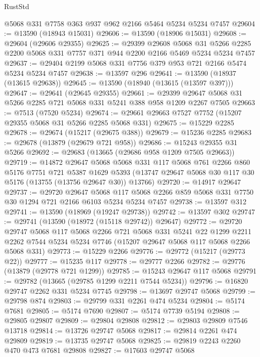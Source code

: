 \begin{lexlean}{RustStd}
\begin{coremodule}
    @5068
    @331
    @7758
    @363
    @937
    @962
    @2166
    @5464
    @5234
    @5234
    @7457
@29604 := @13590 (@18943 @15031)
@29606 := @13590 (@18906 @15031)
@29608 := @29604 (@29606 @29355)
@29625 := @29399
    @29608
    @5068
    @31
    @5266
    @2285
    @2200
    @5068
    @331
    @7757
    @371
    @944
    @2200
    @2166
    @5469
    @5234
    @5234
    @7457
@29637 := @29404 @2199 @5068 @331 @7756 @379 @953 @721 @2166 @5474 @5234 @5234 @7457
@29638 := @13597 @296
@29641 := @13590 (@18937 (@13615 @29638))
@29645 := @13590 (@18940 (@13615 (@13597 @397)))
@29647 := @29641 (@29645 @29355)
@29661 := @29399 @29647 @5068 @31 @5266 @2285 @721 @5068 @331 @5241 @388 @958 @1209 @2267 @7505
@29663 := @7513 (@7520 @5234)
@29674 := @29661 @29663 @7527 @7752 (@15207 @29355 @5068 @31 @5266 @2285 @5068 @331)
@29675 := @15229 @2285
@29678 := @29674 (@15217 (@29675 @388))
@29679 := @15236 @2285
@29683 := @29678 (@13879 (@29679 @721 @958))
@29686 := @15243 @29355 @31 @5266
@29692 := @29683 (@13665 (@29686 @958 @1209 @7505 @29663))
@29719 := @14872
    @29647
    @5068
    @5068
    @331
    @117
    @5068
    @761
    @2266
    @860
    @5176
    @7751
    @721
    @5387
    @1629
    @5393
    (@13747 @29647 @5068 @30 @117 @30 @5176 (@13755 (@13756 @29647 @30)) @13766)
@29720 := @14917 @29647
@29737 := @29720
    @29647
    @5068
    @117
    @5068
    @2266
    @859
    @5068
    @331
    @7750
    @30
    @1294
    @721
    @2166
    @6103
    @5234
    @5234
    @7457
@29738 := @13597 @312
@29741 := @13590 (@18969 (@19247 @29738))
@29742 := @13597 @302
@29747 := @29741 (@13590 (@18972 (@15118 @29742)) @29647)
@29772 := @29720
    @29747
    @5068
    @117
    @5068
    @2266
    @721
    @5068
    @331
    @5241
    @22
    @1299
    @2211
    @2262
    @7544
    @5234
    @5234
    @7746
    (@15207 @29647 @5068 @117 @5068 @2266 @5068 @331)
@29773 := @15229 @2266
@29776 := @29772 (@15217 (@29773 @22))
@29777 := @15235 @117
@29778 := @29777 @2266
@29782 := @29776 (@13879 (@29778 @721 @1299))
@29785 := @15243 @29647 @117 @5068
@29791 := @29782 (@13665 (@29785 @1299 @2211 @7544 @5234))
@29796 := @16820 @29747 @2262 @331 @5234 @7745
@29798 := @13697 @29747 @5068
@29799 := @29798 @874
@29803 := @29799 @331 @2261 @474 @5234
@29804 := @5174 @7681
@29805 := @5174 @7690
@29807 := @5174 @7739 @5194
@29808 := @29805 @29807
@29809 := @29804 @29808
@29812 := @29803 @29809 @7546 @13718
@29814 := @13726 @29747 @5068
@29817 := @29814 @2261 @474 @29809
@29819 := @13735 @29747 @5068
@29825 := @29819 @2243 @2260 @470 @473 @7681 @29808
@29827 := @17603 @29747 @5068

\end{coremodule}
\end{lexlean}
